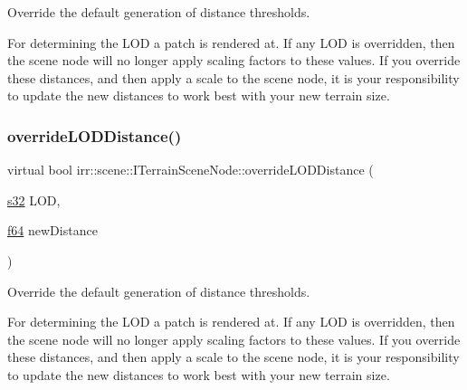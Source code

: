 Override the default generation of distance thresholds. 

For determining the L\+OD a patch is rendered at. If any L\+OD is overridden, then the scene node will no longer apply scaling factors to these values. If you override these distances, and then apply a scale to the scene node, it is your responsibility to update the new distances to work best with your new terrain size. \mbox{\label{classirr_1_1scene_1_1ITerrainSceneNode_af98b54e1a59c014d60ea888eba6010d7}} 
\subsubsection{\texorpdfstring{override\+L\+O\+D\+Distance()}{overrideLODDistance()}\hspace{0.1cm}{\footnotesize\ttfamily [2/2]}}
{\footnotesize\ttfamily virtual bool irr\+::scene\+::\+I\+Terrain\+Scene\+Node\+::override\+L\+O\+D\+Distance (\begin{DoxyParamCaption}\item[{\hyperlink{namespaceirr_ac66849b7a6ed16e30ebede579f9b47c6}{s32}}]{L\+OD,  }\item[{\hyperlink{namespaceirr_a1325b02603ad449f92c68fc640af9b28}{f64}}]{new\+Distance }\end{DoxyParamCaption})\hspace{0.3cm}{\ttfamily [pure virtual]}}



Override the default generation of distance thresholds. 

For determining the L\+OD a patch is rendered at. If any L\+OD is overridden, then the scene node will no longer apply scaling factors to these values. If you override these distances, and then apply a scale to the scene node, it is your responsibility to update the new distances to work best with your new terrain size. \mbox{\label{classirr_1_1scene_1_1ITerrainSceneNode_aacfb35db09be74e32c22a10c7e13bbcc}} 
